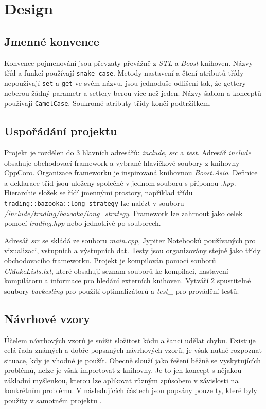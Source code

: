 \chapter{Design}

\section{Jmenné konvence}
Konvence pojmenování jsou převzaty převážně z \textit{STL} a \textit{Boost} knihoven.
Názvy tříd a funkcí používají \texttt{snake\_case}.
Metody nastavení a čtení atributů třídy nepoužívají \texttt{set} a \texttt{get} ve svém názvu, jsou jednoduše odlišeni tak, že gettery neberou žádný parametr a settery berou více než jeden.
Názvy šablon a konceptů používají \texttt{CamelCase}.
Soukromé atributy třídy končí podtržítkem.

\section{Uspořádání projektu}
Projekt je rozdělen do 3 hlavních adresářů: \textit{include}, \textit{src} a \textit{test}.
Adresář \textit{include} obsahuje obchodovací framework a vybrané hlavičkové soubory z knihovny CppCoro.
Organizace frameworku je inspirovaná knihovnou \textit{Boost.Asio}.
Definice a deklarace tříd jsou uloženy společně v jednom souboru s příponou \textit{.hpp}.
Hierarchie složek se řídí jmennými prostory, například třídu \texttt{trading::bazooka::long\_strategy} lze nalézt v souboru \textit{/include/trading/bazooka/long\_strategy}.
Framework lze zahrnout jako celek pomocí \textit{trading.hpp} nebo jednotlivě po souborech.

Adresář \textit{src} se skládá ze souboru \textit{main.cpp}, Jypiter Notebooků používaných pro vizualizaci, vstupních a výstupních dat.
Testy jsou organizovány stejně jako třídy obchodovacího frameworku.
Projekt je kompilován pomocí souborů \textit{CMakeLists.txt}, které obsahují seznam souborů ke kompilaci, nastavení kompilátoru a informace pro hledání externích knihoven.
Vytváří 2 spustitelné soubory \textit{backesting} pro použití optimalizátorů a \textit{test\_} pro provádění testů.

\section{Návrhové vzory}
Účelem návrhových vzorů je snížit složitost kódu a šanci udělat chybu.
Existuje celá řada známých a dobře popsaných návrhových vzorů, je však nutné rozpoznat situace, kdy je vhodné je použít.
Obecně slouží jako řešení běžně se vyskytujících problémů, nelze je však importovat z knihovny.
Je to jen koncept s nějakou základní myšlenkou, kterou lze aplikovat různým způsobem v závislosti na konkrétním problému.
V následujících částech jsou popsány pouze ty, které byly použity v samotném projektu \cite{design-pattern}.

